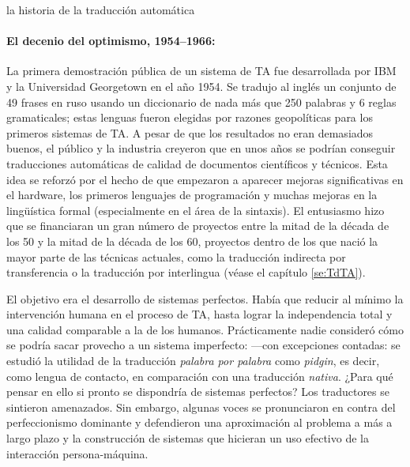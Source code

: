 \begin{persabermes}{la historia de la traducción automática}
\paragraph{El decenio del optimismo, 1954--1966:} La primera demostración pública de un sistema de TA fue desarrollada por IBM y la Universidad Georgetown en el año 1954. Se tradujo al inglés un conjunto de 49 frases en ruso usando un diccionario de nada más que 250 palabras y 6 reglas gramaticales; estas lenguas fueron elegidas por razones geopolíticas para los primeros sistemas de TA. A pesar de que los resultados no eran demasiados buenos, el público y la industria creyeron que en unos años se podrían conseguir traducciones automáticas de calidad de documentos científicos y técnicos. Esta idea se reforzó por el hecho de que empezaron a aparecer mejoras significativas en el hardware, los primeros lenguajes de programación y muchas mejoras en la lingüística formal (especialmente en el área de la sintaxis). El entusiasmo hizo que se financiaran un gran número de proyectos entre la mitad de la década de los 50 y la mitad de la década de los 60, proyectos dentro de los que nació la mayor parte de las técnicas actuales, como la traducción indirecta por transferencia o la traducción por interlingua (véase el capítulo \ref{se:TdTA}). 

El objetivo era el desarrollo de sistemas perfectos. Había que reducir al mínimo la intervención humana en el proceso de TA, hasta lograr la independencia total y una calidad comparable a la de los humanos. Prácticamente nadie consideró cómo se podría sacar provecho a un sistema imperfecto: ---con excepciones contadas: \cite{masterman67b} se estudió la utilidad de la traducción \emph{palabra por palabra} como \emph{pidgin}, es decir, como lengua de contacto, en comparación con una traducción \emph{nativa}. ¿Para qué pensar en ello si pronto se dispondría de sistemas perfectos? Los traductores se sintieron amenazados. Sin embargo, algunas voces se pronunciaron en contra del perfeccionismo dominante y defendieron una aproximación al problema a más a largo plazo y la construcción de sistemas que hicieran un uso efectivo de la interacción persona-máquina. 


\end{persabermes}
